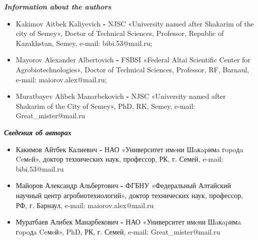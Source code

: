 \emph{{\bfseries Information about the authors}}

\begin{itemize}
\item
Kakimov Aitbek Kaliyevich {\bfseries -} NJSC «University named after
Shakarim of the city of Semey», Doctor of Technical Sciences, Professor,
Republic of Kazakhstan, Semey, e-mail:
bibi.53@mail.ru;

\item
Mayorov Alexander Albertovich {\bfseries -} FSBSI «Federal Altai Scientific
Center for Agrobiotechnologies», Doctor of Technical Sciences,
Professor, RF, Barnaul, e-mail:
maiorov.alex@mail.ru;

\item
Muratbayev Alibek Manarbekovich {\bfseries -} NJSC «University named after
Shakarim of the City of Semey», PhD, RK, Semey, e-mail:
Great\_mister@mail.ru
\end{itemize}

\emph{{\bfseries Сведения об авторах}}

\begin{itemize}
\item
Какимов Айтбек Калиевич {\bfseries -} НАО «Университет имeни Шaкapимa
гopoдa Ceмeй», доктор технических наук, профессор, РК, г. Семей, e-mail:
bibi.53@mail.ru

\item
Майоров Александр Альбертович {\bfseries -} ФГБНУ «Федеральный Алтайский
научный центр агробиотехнологий», доктор технических наук, профессор,
РФ, г. Барнаул, e-mail:
maiorov.alex@mail.ru

\item
Муратбаев Алибек Манарбекович {\bfseries -} НАО «Университет имeни Шaкapимa
гopoдa Ceмeй», PhD, РК, г. Семей, e-mail:
Great\_mister@mail.ru
\end{itemize}
